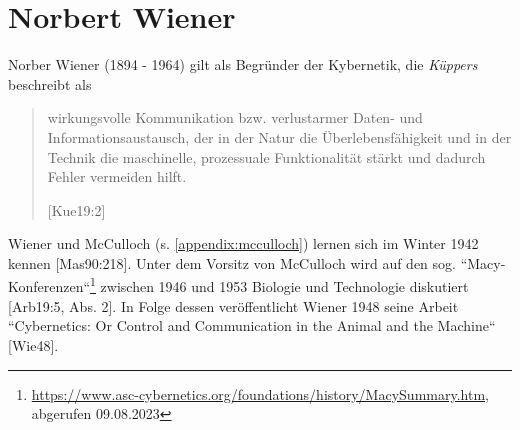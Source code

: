 \section{Norbert Wiener}\label{appendix:wiener}

Norber Wiener (1894 - 1964) gilt als Begründer der Kybernetik, die \textit{Küppers} beschreibt als

\blockquote[{[Kue19:2]}]{
    wirkungsvolle Kommunikation bzw. verlustarmer Daten- und Informationsaustausch, der in der Natur die Überlebensfähigkeit und in der Technik die maschinelle, prozessuale Funktionalität stärkt und dadurch Fehler vermeiden hilft.
}

Wiener und McCulloch (s. \ref{appendix:mcculloch}) lernen sich im Winter 1942 kennen [Mas90:218].
Unter dem Vorsitz von McCulloch wird auf den sog. ``Macy-Konferenzen``\footnote{
    \url{https://www.asc-cybernetics.org/foundations/history/MacySummary.htm}, abgerufen 09.08.2023
} zwischen 1946 und 1953 Biologie und Technologie diskutiert [Arb19:5, Abs. 2].
In Folge dessen veröffentlicht Wiener 1948 seine Arbeit ``Cybernetics: Or Control and Communication in the Animal and the Machine`` [Wie48].